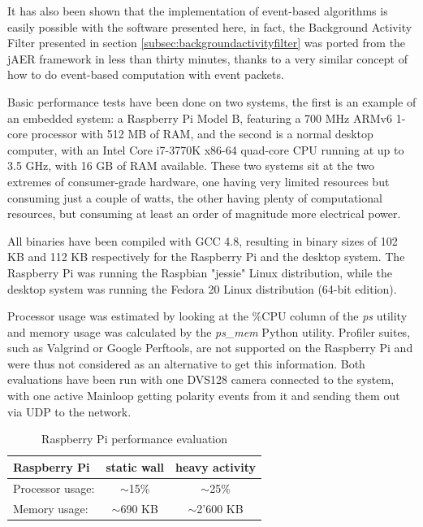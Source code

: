 \documentclass[a4paper,12pt]{report}
\begin{document}
It has also been shown that the implementation of event-based algorithms is easily possible with the software presented here, in fact, the Background Activity Filter presented in section \ref{subsec:backgroundactivityfilter} was ported from the jAER framework in less than thirty minutes, thanks to a very similar concept of how to do event-based computation with event packets.

Basic performance tests have been done on two systems, the first is an example of an embedded system: a Raspberry Pi Model B, featuring a 700 MHz ARMv6 1-core processor with 512 MB of RAM, and the second is a normal desktop computer, with an Intel Core i7-3770K x86-64 quad-core CPU running at up to 3.5 GHz, with 16 GB of RAM available.
These two systems sit at the two extremes of consumer-grade hardware, one having very limited resources but consuming just a couple of watts, the other having plenty of computational resources, but consuming at least an order of magnitude more electrical power.

All binaries have been compiled with GCC 4.8, resulting in binary sizes of 102 KB and 112 KB respectively for the Raspberry Pi and the desktop system.
The Raspberry Pi was running the Raspbian "jessie" Linux distribution, while the desktop system was running the Fedora 20 Linux distribution (64-bit edition).

Processor usage was estimated by looking at the \%CPU column of the \emph{ps} \cite{ps} utility and memory usage was calculated by the \emph{ps\_mem} \cite{psmem} Python utility. Profiler suites, such as Valgrind or Google Perftools, are not supported on the Raspberry Pi and were thus not considered as an alternative to get this information.
Both evaluations have been run with one DVS128 camera connected to the system, with one active Mainloop getting polarity events from it and sending them out via UDP to the network.

\begin{table}[H]
\begin{center}
\caption{Raspberry Pi performance evaluation}
\label{tab:raspberry_pi_performance_evaluation}
\begin{tabu} to \linewidth {|l|c|c|}
\hline
Raspberry Pi & static wall & heavy activity \\ \hline
Processor usage: & $\sim$15\% & $\sim$25\% \\ \hline
Memory usage: & $\sim$690 KB & $\sim$2'600 KB \\ \hline
\end{tabu}
\end{center}
\end{table}
\end{document}
